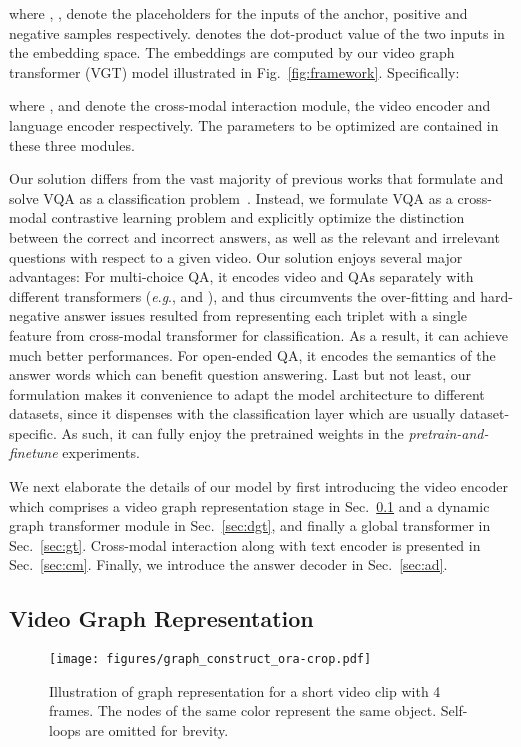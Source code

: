 \documentclass[10pt,journal,compsoc]{IEEEtran}
\newcommand{\eg}{\textit{e}.\textit{g}.}
\begin{document}
where , ,  denote the placeholders for the inputs of the anchor, positive and negative samples respectively.   denotes the dot-product value of the two inputs in the embedding space. The embeddings are computed by our video graph transformer (VGT) model illustrated in Fig.~\ref{fig:framework}. Specifically: 

where ,  and  denote the cross-modal interaction module, the video encoder and language encoder respectively. The parameters to be optimized are contained in these three modules.

Our solution differs from the vast majority of previous works that formulate and solve VQA as a classification problem~\cite{jang2017tgif,lei2021less,xiao2021video}. Instead, we formulate VQA as a cross-modal contrastive learning problem and explicitly optimize the distinction between the correct and incorrect answers, as well as the relevant and irrelevant questions with respect to a given video. Our solution enjoys several major advantages: For multi-choice QA, it encodes video and QAs separately with different transformers (\eg,  and ), and thus circumvents the over-fitting and hard-negative answer issues resulted from representing each  triplet with a single feature from cross-modal transformer for classification. As a result, it can achieve much better performances. For open-ended QA, it encodes the semantics of the answer words which can benefit question answering. Last but not least, our formulation makes it convenience to adapt the model architecture to different datasets, since it dispenses with the classification layer which are usually dataset-specific. As such, it can fully enjoy the pretrained weights in the \emph{pretrain-and-finetune} experiments.

We next elaborate the details of our model by first introducing the video encoder which comprises a video graph representation stage in Sec.~\ref{sec:vgr} and a dynamic graph transformer module in Sec.~\ref{sec:dgt}, and finally a global transformer in Sec.~\ref{sec:gt}. Cross-modal interaction along with text encoder is presented in Sec.~\ref{sec:cm}. Finally, we introduce the answer decoder in Sec.~\ref{sec:ad}. 

\subsection{Video Graph Representation}
\label{sec:vgr}
\begin{figure}[t]
  \begin{center}
    \texttt{[image: figures/graph\_construct\_ora-crop.pdf]}
  \end{center}
  \vspace{-0.3cm}
  \caption{Illustration of graph representation for a short video clip with 4 frames. The nodes of the same color represent the same object. Self-loops are omitted for brevity.}
\vspace{-0.4cm}
  \label{fig:vgr}
\end{figure}
\end{document}
